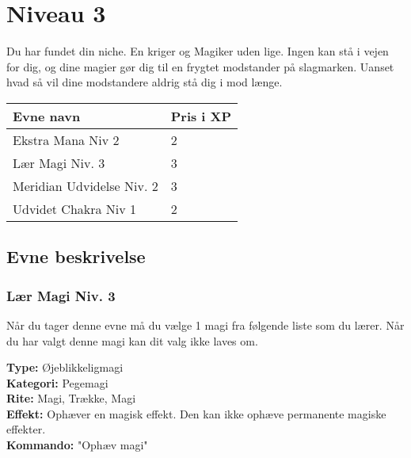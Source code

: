 \chapter{Niveau 3}

Du har fundet din niche. En kriger og Magiker uden lige. Ingen kan stå i vejen for dig, og dine magier gør dig til en frygtet modstander på slagmarken. Uanset hvad så vil dine modstandere aldrig stå dig i mod længe.

\begin{table}[H]
    \centering
    \begin{tabular}{|p{}|p{}|}
    \rowcolor{cerulean!80}\hline
        Evne navn & Pris i XP \\\hline
        Ekstra Mana Niv 2 &2\\\hline
        Lær Magi Niv. 3 & 3 \\\hline
        Meridian Udvidelse Niv. 2 &3\\\hline
        Udvidet Chakra Niv 1 &2\\\hline
    \end{tabular}
\end{table}

\section{Evne beskrivelse}



\subsection{Lær Magi Niv. 3}
Når du tager denne evne må du vælge 1 magi fra følgende liste som du lærer. Når du har valgt denne magi kan dit valg ikke laves om.


\begin{lærmagi*}
\textbf{Type:} Øjeblikkeligmagi\\
\textbf{Kategori:} Pegemagi\\
\textbf{Rite:} Magi, Trække, Magi\\
\textbf{Effekt:} Ophæver en magisk effekt. Den kan ikke ophæve permanente magiske effekter.\\
\textbf{Kommando:} "Ophæv magi"\\
\end{lærmagi*}


